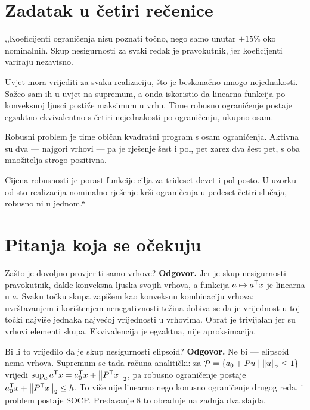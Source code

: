 \section{Zadatak u četiri rečenice}
\label{sec:z2o-sazetak}

\begin{izgovor}
,,Koeficijenti ograničenja nisu poznati točno, nego samo unutar $\pm15\%$ oko
nominalnih. Skup nesigurnosti za svaki redak je pravokutnik, jer koeficijenti
variraju nezavisno.

Uvjet mora vrijediti za svaku realizaciju, što je beskonačno mnogo nejednakosti.
Sažeo sam ih u uvjet na supremum, a onda iskoristio da linearna funkcija po
konveksnoj ljusci postiže maksimum u vrhu. Time robusno ograničenje postaje
egzaktno ekvivalentno s četiri nejednakosti po ograničenju, ukupno osam.

Robusni problem je time običan kvadratni program s osam ograničenja. Aktivna su
dva --- najgori vrhovi --- pa je rješenje šest i pol, pet zarez dva šest pet, s
oba množitelja strogo pozitivna.

Cijena robusnosti je porast funkcije cilja za trideset devet i pol posto. U
uzorku od sto realizacija nominalno rješenje krši ograničenja u pedeset četiri
slučaja, robusno ni u jednom.``
\end{izgovor}

\section{Pitanja koja se očekuju}
\label{sec:z2o-pitanja}

\begin{pitanje}{Zašto je dovoljno provjeriti samo vrhove?}
\textbf{Odgovor.} Jer je skup nesigurnosti pravokutnik, dakle konveksna ljuska
svojih vrhova, a funkcija $a \mapsto a^{\mathsf{T}} x$ je linearna u $a$. Svaku točku
skupa zapišem kao konveksnu kombinaciju vrhova; uvrštavanjem i korištenjem
nenegativnosti težina dobiva se da je vrijednost u toj točki najviše jednaka
najvećoj vrijednosti u vrhovima. Obrat je trivijalan jer su vrhovi elementi
skupa. Ekvivalencija je egzaktna, nije aproksimacija.
\end{pitanje}

\begin{pitanje}{Bi li to vrijedilo da je skup nesigurnosti elipsoid?}
\textbf{Odgovor.} Ne bi --- elipsoid nema vrhova. Supremum se tada računa
analitički: za $\mathcal{P} = \{a_0 + Pu \mid \left\lVert u \right\rVert_2 \leq 1\}$ vrijedi
$\sup_a a^{\mathsf{T}} x = a_0^{\mathsf{T}} x + \left\lVert P^{\mathsf{T}} x \right\rVert_2$, pa robusno ograničenje
postaje $a_0^{\mathsf{T}} x + \left\lVert P^{\mathsf{T}} x \right\rVert_2 \leq h$. To više nije linearno nego
konusno ograničenje drugog reda, i problem postaje SOCP. Predavanje 8 to obrađuje
na zadnja dva slajda.
\end{pitanje}

